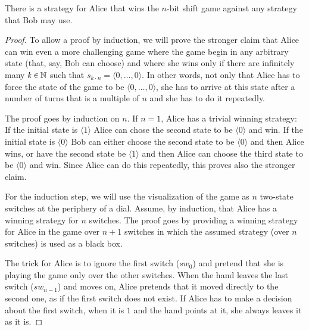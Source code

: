 \documentclass[final,12pt]{elsarticle}
\theoremstyle{definition} \newtheorem{definition}[theorem]{Definition} \newtheorem{observation}[theorem]{Observation} \newtheorem{example}[theorem]{Example} \newtheorem{remark}[theorem]{Remark} \newtheorem{corrolary}[theorem]{Corrolary}
\newcommand{\T}[1]{\langle{#1}\rangle}
\begin{document}
\begin{proposition}
	There is a strategy for Alice that wins the $n$-bit shift game against any strategy that Bob may use.
\end{proposition}
\begin{proof}
	To allow a proof by induction, we will prove the stronger claim that Alice can win even a more challenging game where the game begin in any arbitrary state (that, say, Bob can choose) and where she wins only if there are infinitely many $k \in {\mathbb{N}}$ such that $s_{k \cdot n} = \langle 0, \dots, 0\rangle$. In other words, not only that Alice has to force the state of the game to be $\langle 0, \dots, 0\rangle$, she has to arrive at this state after a number of turns that is a multiple of $n$ and she has to do it repeatedly.

	The proof goes by induction on $n$. If $n=1$, Alice has a trivial winning strategy: If the initial state is $\T{1}$ Alice can chose the second state to be $\T{0}$ and win. If the initial state is $\T{0}$ Bob can either choose the second state to be $\T{0}$ and then Alice wins, or have the second state be $\T{1}$ and then Alice can choose the third state to be $\T{0}$ and win. Since Alice can do this repeatedly, this proves also the stronger claim.

	For the induction step, we will use the visualization of the game as $n$ two-state switches at the periphery of a dial. Assume, by induction, that Alice has a winning strategy for $n$ switches. The proof goes by providing a winning strategy for Alice in the game over $n+1$ switches in which the assumed strategy (over $n$ switches) is used as a black box.

	The trick for Alice is to ignore the first switch ($sw_0$) and pretend that she is playing the game only over the other switches. When the hand leaves the last switch ($sw_{n-1}$) and moves on, Alice pretends that it moved directly to the second one, as if the first switch does not exist. If Alice has to make a decision about the first switch, when it is $1$ and the hand points at it, she always leaves it as it is.


\end{proof}
\end{document}
